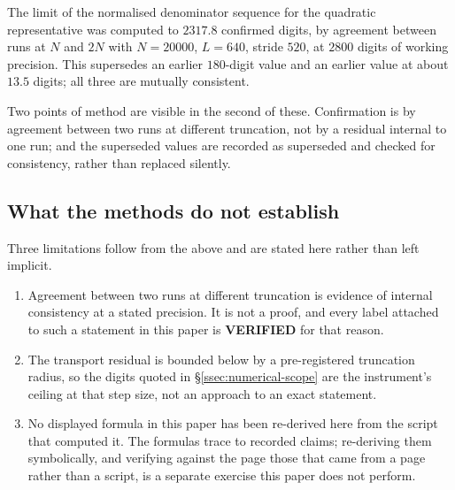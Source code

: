 \begin{remark}
The limit of the normalised denominator sequence for the quadratic
representative was computed to $2317.8$ confirmed digits, by agreement between
runs at $N$ and $2N$ with $N=20000$, $L=640$, stride $520$, at $2800$ digits of
working precision. This supersedes an earlier $180$-digit value and an earlier
value at about $13.5$ digits; all three are mutually consistent.
\end{remark}

Two points of method are visible in the second of these. Confirmation is by
agreement between two runs at different truncation, not by a residual
internal to one run; and the superseded values are recorded as superseded and
checked for consistency, rather than replaced silently.

\subsection{What the methods do not establish}\label{ssec:methods-limits}

Three limitations follow from the above and are stated here rather than left
implicit.

\begin{enumerate}
\item Agreement between two runs at different truncation is evidence of
  internal consistency at a stated precision. It is not a proof, and every
  label attached to such a statement in this paper is \textbf{VERIFIED} for
  that reason.
\item The transport residual is bounded below by a pre-registered truncation
  radius, so the digits quoted in \S\ref{ssec:numerical-scope} are the
  instrument's ceiling at that step size, not an approach to an exact
  statement.
\item No displayed formula in this paper has been re-derived here from the
  script that computed it. The formulas trace to recorded claims; re-deriving
  them symbolically, and verifying against the page those that came from a page
  rather than a script, is a separate exercise this paper does not perform.
\end{enumerate}
